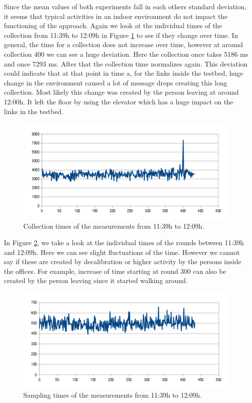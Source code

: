 Since the mean values of both experiments fall in each others standard deviation, it seems that typical activities in an indoor environment do not impact the functioning of the approach. Again we look at the individual times of the collection from 11:39h to 12:09h in Figure \ref{fig:dayC} to see if they change over time. In general, the time for a collection does not increase over time, however at around collection 400 we can see a huge deviation. Here the collection once takes 5186 ms and once 7293 ms. After that the collection time normalizes again. This deviation could indicate that at that point in time a, for the links inside the testbed, huge change in the environment caused a lot of message drops creating this long collection. Most likely this change was created by the person leaving at around 12:00h. It left the floor by using the elevator which has a huge impact on the links in the testbed.


\begin{figure}[htbp]
	\centering         
    \includegraphics[scale=0.75]{content/images/Experiment/DayCollection}
    \caption{Collection times of the measurements from 11:39h to 12:09h.}
	\label{fig:dayC}
\end{figure}

In Figure \ref{fig:DayR}, we take a look at the individual times of the rounds between 11:39h and 12:09h. Here we can see slight fluctuations of the time. However we cannot say if these are created by decalibration or higher activity by the persons inside the offices. For example, increase of time starting at round 300 can also be created by the person leaving since it started walking around.

\begin{figure}[tbp]
	\centering
    \includegraphics[scale=0.75]{content/images/Experiment/DayRounds}
   	\caption{Sampling times of the measurements from 11:39h to 12:09h.}
    \label{fig:DayR}
\end{figure}
    

